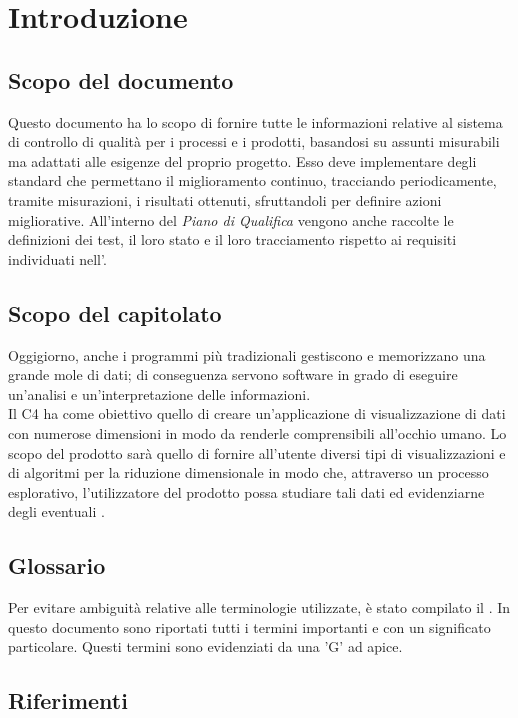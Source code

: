 \section{Introduzione}
\subsection{Scopo del documento}
Questo documento ha lo scopo di fornire tutte le informazioni relative al sistema di controllo di qualità per i processi e i prodotti, basandosi su assunti misurabili ma adattati alle esigenze del proprio progetto.
Esso deve implementare degli standard che permettano il miglioramento continuo, tracciando periodicamente, tramite misurazioni, i risultati ottenuti, sfruttandoli per definire azioni migliorative. All'interno del \textit{Piano di Qualifica} vengono anche raccolte le definizioni dei test, il loro stato e il loro tracciamento rispetto ai requisiti individuati nell'. 

\subsection{Scopo del capitolato}
Oggigiorno, anche i programmi più tradizionali gestiscono e memorizzano una grande mole di dati; di conseguenza servono software in grado di eseguire un'analisi e un'interpretazione delle informazioni.\\
Il  C4 ha come obiettivo quello di creare un'applicazione di visualizzazione di dati con numerose dimensioni in modo da renderle comprensibili all'occhio umano.  Lo scopo del prodotto sarà quello di fornire all'utente diversi tipi di visualizzazioni e di algoritmi per la riduzione dimensionale in modo che, attraverso un processo esplorativo, l'utilizzatore del prodotto possa studiare tali dati ed evidenziarne degli eventuali . 

\subsection{Glossario}
Per evitare ambiguità relative alle terminologie utilizzate, è stato compilato il . In questo documento sono riportati tutti i termini importanti e con un significato particolare. Questi termini sono evidenziati da una 'G' ad apice.

\subsection{Riferimenti}
